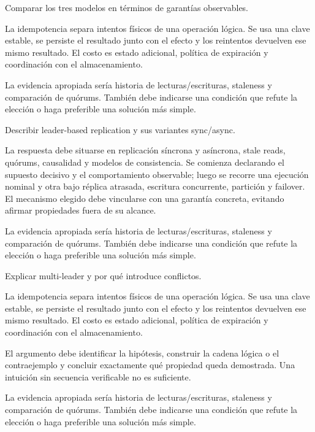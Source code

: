 \documentclass[variant=guia,cover=institutional,mode=screen]{ua-engineering-v6-article}
\begin{document}
\begin{uaexercise}
Comparar los tres modelos en términos de garantías observables.
\end{uaexercise}
\begin{uaanswer}
La idempotencia separa intentos físicos de una operación lógica. Se usa una clave estable, se persiste el resultado junto con el efecto y los reintentos devuelven ese mismo resultado. El costo es estado adicional, política de expiración y coordinación con el almacenamiento.

La evidencia apropiada sería historia de lecturas/escrituras, staleness y comparación de quórums. También debe indicarse una condición que refute la elección o haga preferible una solución más simple.
\end{uaanswer}

\begin{uaexercise}
Describir leader-based replication y sus variantes sync/async.
\end{uaexercise}
\begin{uaanswer}
La respuesta debe situarse en replicación síncrona y asíncrona, stale reads, quórums, causalidad y modelos de consistencia. Se comienza declarando el supuesto decisivo y el comportamiento observable; luego se recorre una ejecución nominal y otra bajo réplica atrasada, escritura concurrente, partición y failover. El mecanismo elegido debe vincularse con una garantía concreta, evitando afirmar propiedades fuera de su alcance.

La evidencia apropiada sería historia de lecturas/escrituras, staleness y comparación de quórums. También debe indicarse una condición que refute la elección o haga preferible una solución más simple.
\end{uaanswer}

\begin{uaexercise}
Explicar multi-leader y por qué introduce conflictos.
\end{uaexercise}
\begin{uaanswer}
La idempotencia separa intentos físicos de una operación lógica. Se usa una clave estable, se persiste el resultado junto con el efecto y los reintentos devuelven ese mismo resultado. El costo es estado adicional, política de expiración y coordinación con el almacenamiento.

El argumento debe identificar la hipótesis, construir la cadena lógica o el contraejemplo y concluir exactamente qué propiedad queda demostrada. Una intuición sin secuencia verificable no es suficiente.

La evidencia apropiada sería historia de lecturas/escrituras, staleness y comparación de quórums. También debe indicarse una condición que refute la elección o haga preferible una solución más simple.
\end{uaanswer}
\end{document}
